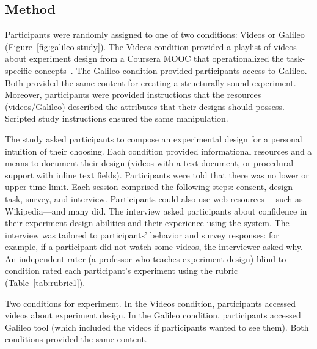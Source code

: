 \subsection*{Method}
Participants were randomly assigned to one of two conditions: Videos or Galileo (Figure~\ref{fig:galileo-study}). The Videos condition provided a playlist of videos about experiment design from a Coursera MOOC that operationalized the task-specific concepts~\cite{Wobbrock2018}. The Galileo condition provided participants access to Galileo. Both provided the same content for creating a structurally-sound experiment. Moreover, participants were provided instructions that the resources (videos/Galileo) described the attributes that their designs should possess. Scripted study instructions ensured the same manipulation. 

The study asked participants to compose an experimental design for a personal intuition of their choosing. Each condition provided informational resources and a means to document their design (videos with a text document, or procedural support with inline text fields). Participants were told that there was no lower or upper time limit. Each session comprised the following steps: consent, design task, survey, and interview. Participants could also use web resources--- such as Wikipedia---and many did. The interview asked participants about confidence in their experiment design abilities and their experience using the system. The interview was tailored to participants' behavior and survey responses: for example, if a participant did not watch some videos, the interviewer asked why. An independent rater (a professor who teaches experiment design) blind to condition rated each participant's experiment using the rubric (Table~\ref{tab:rubric1}).

Two conditions for experiment. In the Videos condition, participants accessed videos about experiment design. In the Galileo condition, participants accessed Galileo tool (which included the videos if participants wanted to see them). Both conditions provided the same content.


